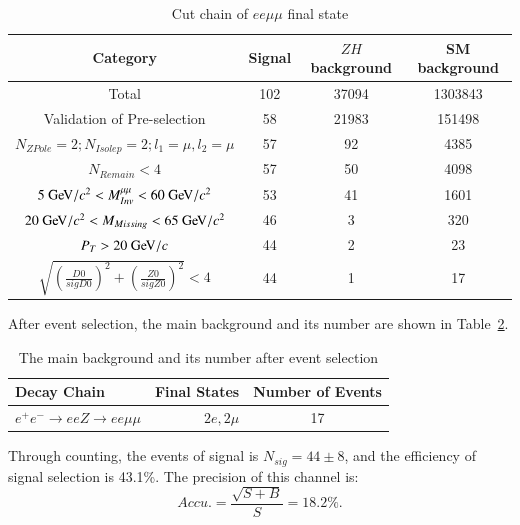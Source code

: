 \documentclass[11pt,a4paper]{cepcnote}
\begin{document}
\begin{table}[H]
  \begin{center}
    \begin{tabular}{cccc}
      \hline \hline
      \multicolumn{1}{c}{Category}&\multicolumn{1}{c}{Signal}&\multicolumn{1}{c}{$ZH$ background}&\multicolumn{1}{c}{SM background}\\ 
      \hline
      Total		       	 									&  102	& 37094	& 1303843\\
	  Validation of Pre-selection							&  58	& 21983	& 151498\\
      $N_{ZPole}=2; N_{Isolep}=2; l_1 = \mu, l_2 = \mu$	 	&  57	& 92	& 4385\\
	  $N_{Remain} < 4$										&  57	& 50	& 4098\\
	  $5\gev/c^2 < M_{Inv}^{\mu\mu} < 60\gev/c^2$	   	   	&  53	& 41	& 1601	\\
	  $20\gev/c^2 < M_{Missing} < 65\gev/c^2$	        	&  46	& 3		& 320		\\
	  $P_{T} > 20\gev/c$									&  44	& 2		& 23		\\
	  $\sqrt{(\frac{D0}{sigD0})^2+(\frac{Z0}{sigZ0})^2} < 4$&  44 	& 1		& 17	\\
      \hline \hline
    \end{tabular}
   \caption[Monte Carlo purities in the single lepton sample]{Cut chain of $ee \mu\mu$ final state}
  \label{tab:cutchaineeuvuv}
 \end{center}
\end{table}

After event selection, the main background and its number are shown in Table~\ref{tab:bkgineeuvuv}.
\begin{table}[H]
	\begin{center}
		\begin{tabular}{lrc}
			\hline\hline
			Decay Chain	& Final States 	&	Number of Events	\\
			\hline
			$e^+e^-\to eeZ \to ee\mu\mu $ & $2e, 2\mu$	&	17\\
			\hline\hline
		\end{tabular}
		\caption[]{The main background and its number after event selection}
		\label{tab:bkgineeuvuv}
	\end{center}
\end{table}

Through counting, the events of signal is $N_{sig} = 44\pm 8$, and the efficiency of signal selection is 43.1\%.
The precision of this channel is:
\begin{equation*}
	Accu. = \frac{\sqrt{S+B}}{S} = 18.2\%.
\end{equation*}
\end{document}
